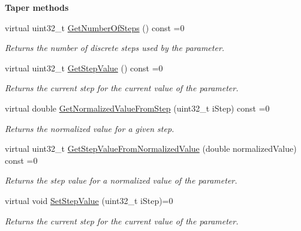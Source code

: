 \begin{Indent}{\bf Taper methods}
\begin{DoxyCompactItemize}
virtual uint32\+\_\+t \hyperlink{a00108_af2a4893e048666aca929846e7b5634cd}{Get\+Number\+Of\+Steps} () const =0
\begin{DoxyCompactList}\small\item\em Returns the number of discrete steps used by the parameter. \end{DoxyCompactList}\item 
virtual uint32\+\_\+t \hyperlink{a00108_ad4fc7431439f53cc0253d191b19db00b}{Get\+Step\+Value} () const =0
\begin{DoxyCompactList}\small\item\em Returns the current step for the current value of the parameter. \end{DoxyCompactList}\item 
virtual double \hyperlink{a00108_a793cc6ffe2688f26e2afb8277e07ade6}{Get\+Normalized\+Value\+From\+Step} (uint32\+\_\+t i\+Step) const =0
\begin{DoxyCompactList}\small\item\em Returns the normalized value for a given step. \end{DoxyCompactList}\item 
virtual uint32\+\_\+t \hyperlink{a00108_a5ff847bf1730bda6c91189aba8969557}{Get\+Step\+Value\+From\+Normalized\+Value} (double normalized\+Value) const =0
\begin{DoxyCompactList}\small\item\em Returns the step value for a normalized value of the parameter. \end{DoxyCompactList}\item 
virtual void \hyperlink{a00108_a9f92e51fce44dbf25a7265286c72d0ea}{Set\+Step\+Value} (uint32\+\_\+t i\+Step)=0
\begin{DoxyCompactList}\small\item\em Returns the current step for the current value of the parameter. \end{DoxyCompactList}\end{DoxyCompactItemize}
\end{Indent}
